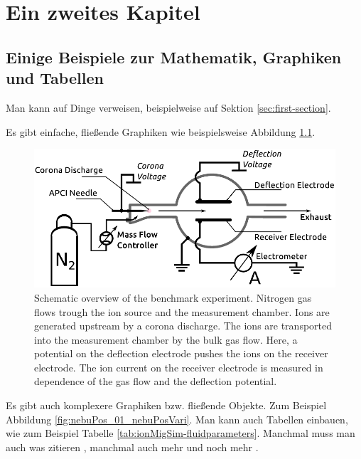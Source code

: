 \chapter{Ein zweites Kapitel}
\section{Einige Beispiele zur Mathematik, Graphiken und Tabellen}
Man kann auf Dinge verweisen, beispielweise auf Sektion \vref{sec:first-section}.

Es gibt einfache, fließende Graphiken wie beispielsweise Abbildung \ref{fig:ionMigSim-experiment-overview}. 

\begin{figure}[tb]
   \begin{center}
   \includegraphics[width=0.8\columnwidth]{images/ionMigration_experimentOverview.pdf}
   \caption[Schematic benchmark overview]{Schematic overview of the benchmark experiment. Nitrogen gas flows trough the ion source and the measurement chamber. Ions are generated upstream by a corona discharge. The ions are transported into the measurement chamber by the bulk gas flow. Here, a potential on the deflection electrode pushes the ions on the receiver electrode. The ion current on the receiver electrode is measured in dependence of the gas flow and the deflection potential.}
   \label{fig:ionMigSim-experiment-overview}
   \end{center}
\end{figure}

Es gibt auch komplexere Graphiken bzw. fließende Objekte. Zum Beispiel Abbildung \ref{fig:nebuPos_01_nebuPosVari}. Man kann auch Tabellen einbauen, wie zum Beispiel Tabelle \vref{tab:ionMigSim-fluidparameters}. Manchmal muss man auch was zitieren \cite{Poehler2011}, manchmal auch mehr \cite{Serway2009,Chang1991} und noch mehr \cite{Valentine2009,Schiewek2007,Python2.7}.

